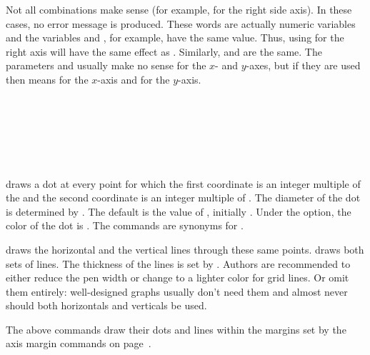 \documentclass[letterpaper]{article}
\begin{document}
Not all combinations make sense (for example,  for the right
side axis). In these cases, no error message is produced. These words
are actually \MF{} numeric variables and the variables  and
, for example, have the same value. Thus, using 
for the right axis will have the same effect as . Similarly,
 and  are the same. The parameters
 and  usually make no sense for the $x$- and
$y$-axes, but if they are used then  means  for
the $x$-axis and  for the $y$-axis.

\begin{cd}
\\
\\
\\
\\
\\
%
%
%
%
%
%
%
\end{cd}

 draws a dot at every point for which the first coordinate is
an integer multiple of the  and the second coordinate is an
integer multiple of . The diameter of the dot is determined
by . The default is the value of ,
initially \dim{0.5pt}. Under the  option, the color of the
dot is . The commands 
are synonyms for .

 draws the horizontal and  the vertical
lines through these same points.  draws both sets of
lines. The thickness of the lines is set by . Authors are
recommended to either reduce the pen width or change  to
a lighter color for grid lines. Or omit them entirely: well-designed
graphs usually don't need them and almost never should both horizontals
and verticals be used.

The above commands draw their dots and lines within the margins set by the
axis margin commands on page~\pageref{axismargin}.
\end{document}

